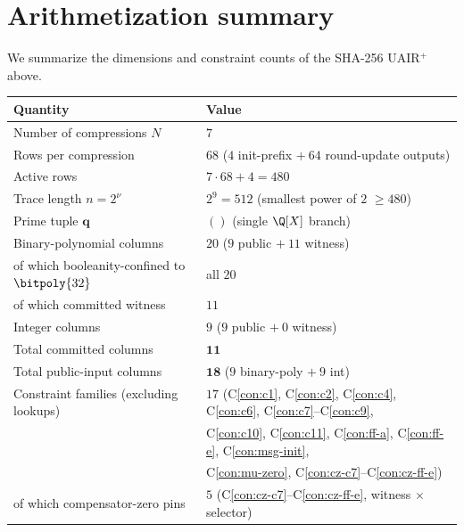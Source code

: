 \section{Arithmetization summary}\label{sec:summary}

We summarize the dimensions and constraint counts of the SHA-256
UAIR$^+$ above.

\begin{center}
\small
\begin{tabular}{ll}
\toprule
\textbf{Quantity} & \textbf{Value} \\
\midrule
Number of compressions $N$        & $7$ \\
Rows per compression              & $68$ \quad ($4$ init-prefix $+\ 64$ round-update outputs) \\
Active rows                       & $7 \cdot 68 + 4 = 480$ \\
Trace length $n = 2^{\nu}$        & $2^{9} = 512$ \quad (smallest power of $2$ $\ge 480$) \\
Prime tuple $\mathbf{q}$          & $()$ \quad (single $\Q[X]$ branch) \\
\midrule
Binary-polynomial columns         & $20$ \quad ($9$ public $+\ 11$ witness) \\
\quad of which booleanity-confined to $\bitpoly{32}$ & all $20$  \\
\quad of which committed witness  & $11$ \\
Integer columns                   & $9$ \quad ($9$ public $+\ 0$ witness) \\
\midrule
Total committed columns           & $\mathbf{11}$ \\
Total public-input columns        & $\mathbf{18}$ \quad ($9$ binary-poly $+\ 9$ int) \\
\midrule
Constraint families (excluding lookups) & $17$ \quad (C\ref{con:c1}, C\ref{con:c2}, C\ref{con:c4}, C\ref{con:c6}, C\ref{con:c7}--C\ref{con:c9}, \\
                                  & \phantom{$17$ \quad } C\ref{con:c10}, C\ref{con:c11}, C\ref{con:ff-a}, C\ref{con:ff-e}, C\ref{con:msg-init}, \\
                                  & \phantom{$17$ \quad } C\ref{con:mu-zero}, C\ref{con:cz-c7}--C\ref{con:cz-ff-e}) \\
\quad of which compensator-zero pins & $5$ \quad (C\ref{con:cz-c7}--C\ref{con:cz-ff-e}, witness $\times$ selector) \\

\end{tabular}
\end{center}
